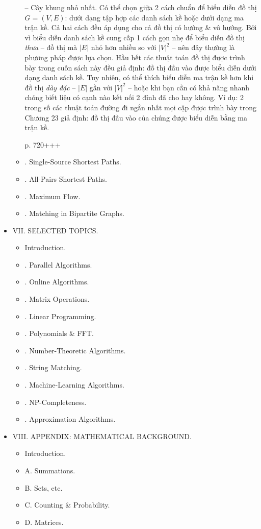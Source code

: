 \documentclass{article}
\begin{document}
\begin{itemize}
\begin{itemize}
		-- {\sf Cây khung nhỏ nhất.} Có thể chọn giữa 2 cách chuẩn để biểu diễn đồ thị $G = (V,E)$: dưới dạng tập hợp các danh sách kề hoặc dưới dạng ma trận kề. Cả hai cách đều áp dụng cho cả đồ thị có hướng \& vô hướng. Bởi vì biểu diễn danh sách kề cung cấp 1 cách gọn nhẹ để biểu diễn đồ thị {\it thưa} -- đồ thị mà $|E|$ nhỏ hơn nhiều so với $|V|^2$ -- nên đây thường là phương pháp được lựa chọn. Hầu hết các thuật toán đồ thị được trình bày trong cuốn sách này đều giả định: đồ thị đầu vào được biểu diễn dưới dạng danh sách kề. Tuy nhiên, có thể thích biểu diễn ma trận kề hơn khi đồ thị {\it dày đặc} -- $|E|$ gần với $|V|^2$ -- hoặc khi bạn cần có khả năng nhanh chóng biết liệu có cạnh nào kết nối 2 đỉnh đã cho hay không. Ví dụ: 2 trong số các thuật toán đường đi ngắn nhất mọi cặp được trình bày trong Chương 23 giả định: đồ thị đầu vào của chúng được biểu diễn bằng ma trận kề.
		
		p. 720+++
		\item {. Single-Source Shortest Paths.}
		\item {. All-Pairs Shortest Paths.}
		\item {. Maximum Flow.}
		\item {. Matching in Bipartite Graphs.}
	\end{itemize}
	\item {\sf VII. SELECTED TOPICS.}
	\begin{itemize}
		\item {\sf Introduction.}
		\item {. Parallel Algorithms.}
		\item {. Online Algorithms.}
		\item {. Matrix Operations.}
		\item {. Linear Programming.}
		\item {. Polynomials \& FFT.}
		\item {. Number-Theoretic Algorithms.}
		\item {. String Matching.}
		\item {. Machine-Learning Algorithms.}
		\item {. NP-Completeness.}
		\item {. Approximation Algorithms.}
	\end{itemize}
	\item {\sf VIII. APPENDIX: MATHEMATICAL BACKGROUND.}
	\begin{itemize}
		\item {\sf Introduction.}
		\item {\sf A. Summations.}
		\item {\sf B. Sets, etc.}
		\item {\sf C. Counting \& Probability.}
		\item {\sf D. Matrices.}
	\end{itemize}
\end{itemize}
\end{document}

